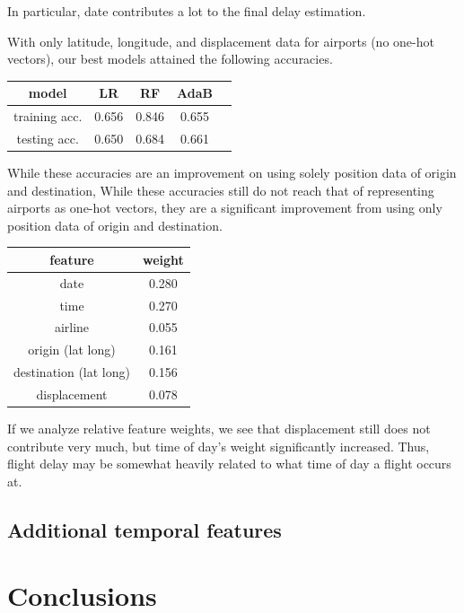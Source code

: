 \documentclass{article}
\begin{document}
\begin{multicols}{2}
In particular, date contributes a lot
to the final delay estimation.

With only latitude, longitude, and displacement data
for airports (no one-hot vectors),
our best models attained the following accuracies.

\begin{center}
    \begin{tabular}{c|cccc}
        model &
          LR & RF & AdaB \\\hline
        training acc. &
          0.656 & 0.846 & 0.655 \\
        testing acc. &
          0.650 & 0.684 & 0.661
    \end{tabular}
\end{center}

While these accuracies are an improvement
on using solely position data of origin and destination,
While these accuracies still do not reach that of
representing airports as one-hot vectors,
they are a significant improvement
from using only position data of origin and destination.

\begin{center}
    \begin{tabular}{c|c}
        feature & weight \\\hline
        date & 0.280 \\
        time & 0.270 \\
        airline & 0.055 \\
        origin (lat long) & 0.161 \\
        destination (lat long) & 0.156 \\
        displacement & 0.078
    \end{tabular}
\end{center}

If we analyze relative feature weights,
we see that displacement still does not contribute very much,
but time of day's weight significantly increased.
Thus, flight delay may be somewhat heavily related to
what time of day a flight occurs at.

\subsection{Additional temporal features}



\section{Conclusions}






\end{multicols}
\end{document}
